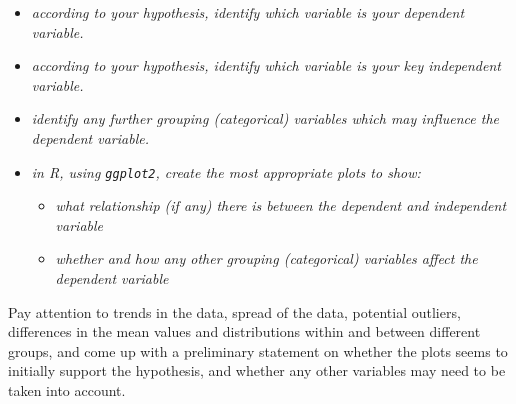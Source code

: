 \documentclass[
]{book}
\providecommand{\tightlist}{%
  \setlength{\itemsep}{0pt}\setlength{\parskip}{0pt}}
\begin{document}
\begin{itemize}
\tightlist
\item
  \emph{according to your hypothesis, identify which variable is your dependent variable.}
\item
  \emph{according to your hypothesis, identify which variable is your key independent variable.}
\item
  \emph{identify any further grouping (categorical) variables which may influence the dependent variable.}
\item
  \emph{in R, using \texttt{ggplot2}, create the most appropriate plots to show:}

  \begin{itemize}
  \tightlist
  \item
    \emph{what relationship (if any) there is between the dependent and independent variable}
  \item
    \emph{whether and how any other grouping (categorical) variables affect the dependent variable}
  \end{itemize}
\end{itemize}

Pay attention to trends in the data, spread of the data, potential outliers,
differences in the mean values and distributions within and between different groups,
and come up with a preliminary statement on whether the plots seems to initially
support the hypothesis, and whether any other variables may need to be taken into account.\\
~\\

  
\end{document}
